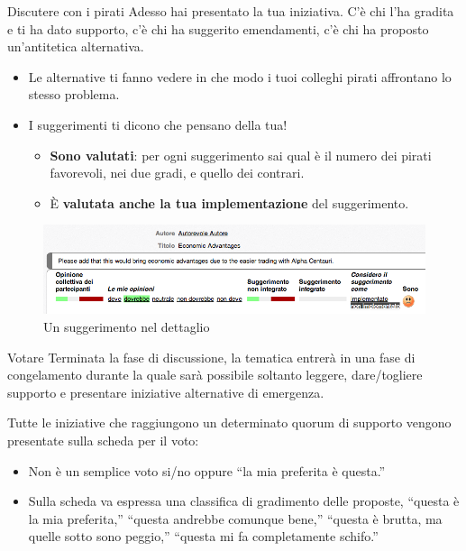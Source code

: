 \documentclass{beamer}
\begin{document}
\begin{frame}{Discutere con i pirati}
Adesso hai presentato la tua iniziativa. C'\`e chi l'ha gradita e ti ha dato supporto, c'\`e chi ha suggerito emendamenti, c'\`e chi ha proposto un'antitetica alternativa. \begin{itemize}\item Le alternative ti fanno vedere in che modo i tuoi colleghi pirati affrontano lo stesso problema. \item I suggerimenti ti dicono che pensano della tua!\begin{itemize}\item {\bfseries Sono valutati}: per ogni suggerimento sai qual \`e il numero dei pirati favorevoli, nei due gradi, e quello dei contrari. \item \`E {\bfseries valutata anche la tua implementazione} del suggerimento.\end{itemize}\end{itemize} \begin{figure}\includegraphics[width=\textwidth]{pics/suggerimento}
\caption{Un suggerimento nel dettaglio}
\end{figure}
\end{frame}

\begin{frame}{Votare}
Terminata la fase di discussione, la tematica entrer\`a in una fase di congelamento durante la quale sar\`a possibile soltanto leggere, dare/togliere supporto e presentare iniziative alternative di emergenza.

Tutte le iniziative che raggiungono un determinato quorum di supporto vengono presentate sulla scheda per il voto:\begin{itemize}\item Non \`e un semplice voto si/no oppure ``la mia preferita \`e questa.''\item Sulla scheda va espressa una classifica di gradimento delle proposte, ``questa \`e la mia preferita,'' ``questa andrebbe comunque bene,'' ``questa \`e brutta, ma quelle sotto sono peggio,'' ``questa mi fa completamente schifo.''\end{itemize}
\end{frame}
\end{document}
